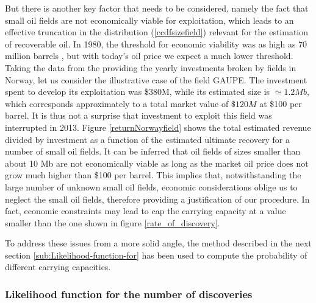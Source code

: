 \documentclass[review]{elsarticle}
\begin{document}
But there is another key factor that needs to be considered, namely the fact that small oil fields are not economically viable for exploitation, which leads to an effective truncation in the distribution (\ref{ccdfsizefield}) relevant for the estimation of recoverable oil. In 1980, the threshold for economic viability was as high as 70 million barrels \cite[p. 591]{Smith1980}, but with today's oil price we expect a much lower threshold. Taking the data from the  providing the yearly investments broken by fields in Norway, let us consider the illustrative case of the field GAUPE. The investment spent to develop its exploitation was  \$380M, while its estimated size is $\simeq 1.2Mb$, which corresponds approximately to a total market value of $\$120M$ at \$100 per barrel. It is thus not a surprise that investment to exploit this field was interrupted in 2013.
Figure \ref{returnNorwayfield} shows the total estimated revenue divided
by investment as a function of the estimated ultimate recovery for a number
of small oil fields. It can be inferred that oil fields of sizes smaller than about 10 Mb
are not economically viable as long as the market oil price does not 
grow much higher than \$100 per barrel. This implies that, notwithstanding
the large number of unknown small oil fields, economic considerations
oblige us to neglect the small oil fields, therefore providing
a justification of our procedure. In fact, economic constraints may lead to 
cap the carrying capacity at a value smaller than 
the one shown in figure  \ref{rate_of_discovery}. 

To address these issues from a more solid angle, the method
described in the next section \ref{sub:Likelihood-function-for} has been used
to compute the probability of different carrying capacities.


\subsubsection{Likelihood function for the number of discoveries\label{sub:Likelihood-function-for}}
\end{document}
